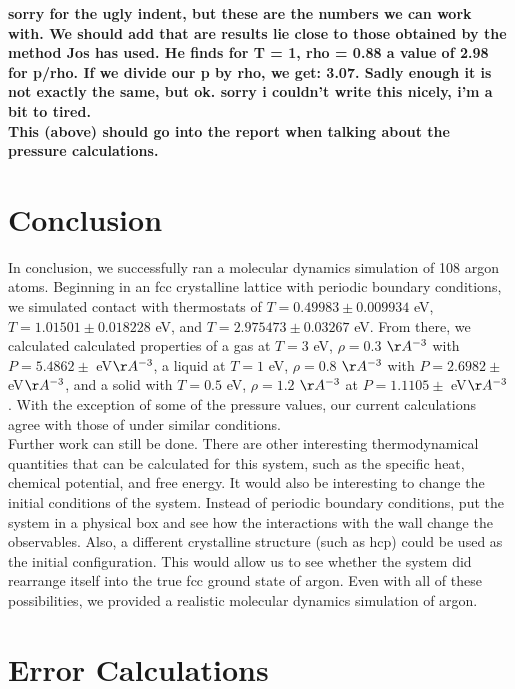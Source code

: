 \documentclass{article}
\begin{document}
\begin{multicols}{2}
\textbf{sorry for the ugly indent, but these are the numbers we can work with. We should add that are results lie close to those obtained by the method Jos has used. He finds for T = 1, rho = 0.88 a value of 2.98 for p/rho. If we divide our p by rho, we get: 3.07. Sadly enough it is not exactly the same, but ok. sorry i couldn't write this nicely, i'm a bit to tired.}\\

\textbf{This (above) should go into the report when talking about the pressure calculations.}

\section{Conclusion}
\label{conc}

In conclusion, we successfully ran a molecular dynamics simulation of 108 argon atoms.  Beginning in an fcc crystalline lattice with periodic boundary conditions, we simulated contact with thermostats of $T=0.49983 \pm 0.009934$ eV, $T= 1.01501 \pm 0.018228$ eV, and $T=2.975473 \pm 0.03267$ eV.  From there, we calculated calculated properties of a gas at $T=3$ eV, $\rho=0.3$ $\AA ^{-3}$ with $P=5.4862 \pm $ eV$\AA^{-3}$, a liquid at $T=1$ eV, $\rho =0.8$ $\AA ^{-3}$ with $P=2.6982 \pm $ eV$\AA^{-3}$, and a solid with $T=0.5$ eV, $\rho=1.2$ $\AA ^{-3}$ at $P=1.1105 \pm $ eV$\AA^{-3}$.  With the exception of some of the pressure values, our current calculations agree with those of \cite{thijssen} under similar conditions.  \\

Further work can still be done.  There are other interesting thermodynamical quantities that can be calculated for this system, such as the specific heat, chemical potential, and free energy.  It would also be interesting to change the initial conditions of the system.  Instead of periodic boundary conditions, put the system in a physical box and see how the interactions with the wall change the observables.  Also, a different crystalline structure (such as hcp) could be used as the initial configuration.  This would allow us to see whether the system did rearrange itself into the true fcc ground state of argon.  Even with all of these possibilities, we provided a realistic molecular dynamics simulation of argon.  

\appendix 

\section{Error Calculations}


\end{multicols}
\end{document}
